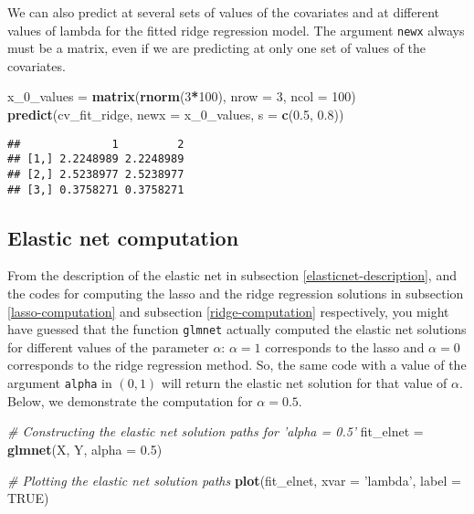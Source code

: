 \documentclass[
]{book}
\newenvironment{Shaded}{\begin{snugshade}}{\end{snugshade}}
\newcommand{\CommentTok}[1]{\textcolor[rgb]{0.56,0.35,0.01}{\textit{#1}}}
\newcommand{\DataTypeTok}[1]{\textcolor[rgb]{0.13,0.29,0.53}{#1}}
\newcommand{\DecValTok}[1]{\textcolor[rgb]{0.00,0.00,0.81}{#1}}
\newcommand{\FloatTok}[1]{\textcolor[rgb]{0.00,0.00,0.81}{#1}}
\newcommand{\KeywordTok}[1]{\textcolor[rgb]{0.13,0.29,0.53}{\textbf{#1}}}
\newcommand{\NormalTok}[1]{#1}
\newcommand{\OperatorTok}[1]{\textcolor[rgb]{0.81,0.36,0.00}{\textbf{#1}}}
\newcommand{\OtherTok}[1]{\textcolor[rgb]{0.56,0.35,0.01}{#1}}
\newcommand{\StringTok}[1]{\textcolor[rgb]{0.31,0.60,0.02}{#1}}
\begin{document}
We can also predict at several sets of values of the covariates and at different values of lambda for the fitted ridge regression model. The argument \texttt{newx} always must be a matrix, even if we are predicting at only one set of values of the covariates.

\begin{Shaded}
\begin{Highlighting}[]
\NormalTok{x_}\DecValTok{0}\NormalTok{_values =}\StringTok{ }\KeywordTok{matrix}\NormalTok{(}\KeywordTok{rnorm}\NormalTok{(}\DecValTok{3}\OperatorTok{*}\DecValTok{100}\NormalTok{), }\DataTypeTok{nrow =} \DecValTok{3}\NormalTok{, }\DataTypeTok{ncol =} \DecValTok{100}\NormalTok{)}
\KeywordTok{predict}\NormalTok{(cv_fit_ridge, }\DataTypeTok{newx =}\NormalTok{ x_}\DecValTok{0}\NormalTok{_values, }\DataTypeTok{s =} \KeywordTok{c}\NormalTok{(}\FloatTok{0.5}\NormalTok{, }\FloatTok{0.8}\NormalTok{))}
\end{Highlighting}
\end{Shaded}

\begin{verbatim}
##              1         2
## [1,] 2.2248989 2.2248989
## [2,] 2.5238977 2.5238977
## [3,] 0.3758271 0.3758271
\end{verbatim}

\hypertarget{elasticnet-computation}{%
\subsection{Elastic net computation}\label{elasticnet-computation}}

From the description of the elastic net in subsection \ref{elasticnet-description}, and the codes for computing the lasso and the ridge regression solutions in subsection \ref{lasso-computation} and subsection \ref{ridge-computation} respectively, you might have guessed that the function \texttt{glmnet} actually computed the elastic net solutions for different values of the parameter \(\alpha\): \(\alpha = 1\) corresponds to the lasso and \(\alpha = 0\) corresponds to the ridge regression method. So, the same code with a value of the argument \texttt{alpha} in \((0, 1)\) will return the elastic net solution for that value of \(\alpha\). Below, we demonstrate the computation for \(\alpha = 0.5\).

\begin{Shaded}
\begin{Highlighting}[]
\CommentTok{# Constructing the elastic net solution paths for 'alpha = 0.5'}
\NormalTok{fit_elnet =}\StringTok{ }\KeywordTok{glmnet}\NormalTok{(X, Y, }\DataTypeTok{alpha =} \FloatTok{0.5}\NormalTok{)}

\CommentTok{# Plotting the elastic net solution paths}
\KeywordTok{plot}\NormalTok{(fit_elnet, }\DataTypeTok{xvar =} \StringTok{'lambda'}\NormalTok{, }\DataTypeTok{label =} \OtherTok{TRUE}\NormalTok{)}
\end{Highlighting}
\end{Shaded}
\end{document}
